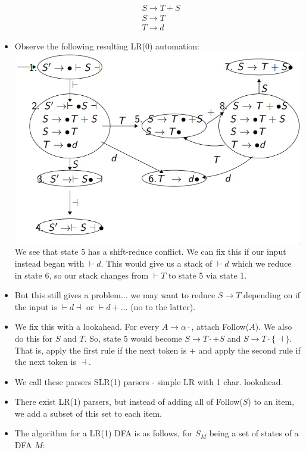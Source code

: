 \documentclass[12pt]{article}
\begin{document}
\begin{itemize}
\begin{align*}
            &S \rightarrow T + S \\
            &S \rightarrow T \\
            &T \rightarrow d
        \end{align*}
    \item Observe the following resulting LR(0) automation:\\
        \includegraphics[scale=0.5]{conflict.png}\\
        We see that state 5 has a shift-reduce conflict.  We can fix this if our input instead began with $\vdash d$.  This would give us a stack of $\vdash d$ which we reduce in state 6, so our stack changes from $\vdash T$ to state 5 via state 1. 
    \item But this still gives a problem... we may want to reduce $S \rightarrow T$ depending on if the input is $\vdash d \dashv$ or $\vdash d + \dots$ (no to the latter).
    \item We fix this with a lookahead.  For every $A \rightarrow \alpha \cdot$, attach Follow($A$).  We also do this for $S$ and $T$.  So, state 5 would become $S \rightarrow T \cdot + S$ and $S \rightarrow T \cdot \{\dashv\}$.  That is, apply the first rule if the next token is $+$ and apply the second rule if the next token is $\dashv$.
    \item We call these parsers SLR(1) parsers - simple LR with 1 char. lookahead.
    \item There exist LR(1) parsers, but instead of adding all of Follow($S$) to an item, we add a subset of this set to each item.
    \item The algorithm for a LR(1) DFA is as follows, for $S_M$ being a set of states of a DFA $M$:\\

\end{itemize}
\end{document}
